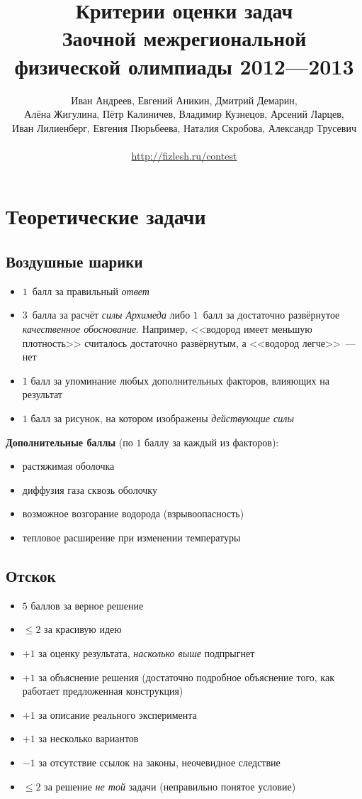 \documentclass[10pt, a4paper, oneside, fleqn]{article}
\title{Критерии оценки задач\\
Заочной межрегиональной\\
физической олимпиады 2012---2013}
\author{\small{
Иван Андреев,
Евгений Аникин,
Дмитрий Демарин,
}\\
\small{
Алёна Жигулина,
Пётр Калиничев,
Владимир Кузнецов,
Арсений Ларцев,
}\\
\small{
Иван Лилиенберг,
Евгения Пюрьбеева,
Наталия Скробова,
Александр Трусевич
}\\
\\
\url{http://fizlesh.ru/contest}}
\newcommand\т{~--- }
\def\le{\leqslant}
\newenvironment{items}
{\begin{itemize}%
\setlength{\itemsep}{-1pt}}
{\end{itemize}}
\begin{document}

\maketitle

\section{Теоретические задачи}

\subsection{Воздушные шарики}

\begin{items}
\item $1$~балл за правильный \emph{ответ}
\item $3$~балла за расчёт \emph{силы Архимеда} либо $1$~балл за достаточно развёрнутое \emph{качественное обоснование}.
Например, <<водород имеет меньшую плотность>> считалось достаточно развёрнутым, а <<водород легче>>\т нет
\item $1$ балл за упоминание любых дополнительных факторов, влияющих на результат
\item $1$ балл за рисунок, на котором изображены \emph{действующие силы}
\end{items}

\textbf{Дополнительные баллы} (по $1$ баллу за каждый из факторов):
\begin{items}
\item растяжимая оболочка
\item диффузия газа сквозь оболочку
\item возможное возгорание водорода (взрывоопасность)
\item тепловое расширение при изменении температуры
\end{items}

\subsection{Отскок}

\begin{items}
\item $5$ баллов за верное решение
\item $\le 2$ за красивую идею
\item $+1$ за оценку результата, \emph{насколько выше} подпрыгнет
\item $+1$ за объяснение решения (достаточно подробное объяснение того, как работает предложенная конструкция)
\item $+1$ за описание реального эксперимента
\item $+1$ за несколько вариантов
\item $-1$ за отсутствие ссылок на законы, неочевидное следствие
\item $\le 2$ за решение \emph{не той} задачи (неправильно понятое условие)
\end{items}
\end{document}
